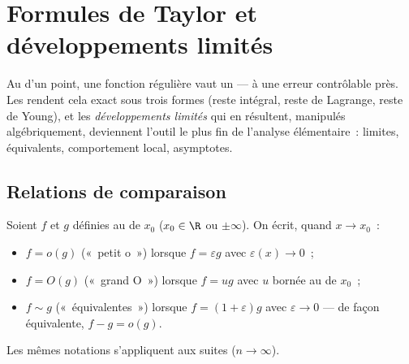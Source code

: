 \chapter{Formules de Taylor et développements limités}\label{ch:b1:taylor}

Au  d'un point, une fonction régulière vaut un  --- à
une erreur contrôlable près. Les  rendent cela exact
sous trois formes (reste intégral, reste de Lagrange, reste de Young),
et les \emph{développements limités} qui en résultent, manipulés
algébriquement, deviennent l'outil le plus fin de l'analyse
élémentaire~: limites, équivalents, comportement local, asymptotes.

\section{Relations de comparaison}

\begin{definition}\label{def:b1:taylor:landau}
Soient $f$ et $g$ définies au  de $x_0$ ($x_0 \in \R$ ou
$\pm\infty$). On écrit, quand $x \to x_0$~:
\begin{itemize}
  \item $f = o(g)$ («~petit o~») lorsque $f = \varepsilon g$ avec
        $\varepsilon(x) \to 0$~;
  \item $f = O(g)$ («~grand O~») lorsque $f = u g$ avec $u$ bornée au
         de $x_0$~;
  \item $f \sim g$ («~équivalentes~»)
        lorsque $f = (1 + \varepsilon) g$ avec $\varepsilon \to 0$ ---
        de façon équivalente, $f - g = o(g)$.
\end{itemize}
Les mêmes notations s'appliquent aux suites ($n \to \infty$).
\end{definition}

